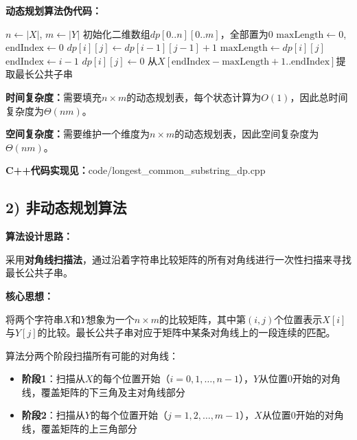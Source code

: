 \documentclass[UTF8,12pt,a4paper]{ctexart}
\begin{document}
\begin{enumerate}[1.]
	\textbf{动态规划算法伪代码：}
	\begin{algorithm}[H]%
		\caption{LCS-SUBSTRING-DP($X, Y$)}
		\begin{algorithmic}[1]
			\State $n \gets |X|$, $m \gets |Y|$
			\State 初始化二维数组$dp[0..n][0..m]$，全部置为0
			\State $\text{maxLength} \gets 0$, $\text{endIndex} \gets 0$
						\State $dp[i][j] \gets dp[i-1][j-1] + 1$
							\State $\text{maxLength} \gets dp[i][j]$
							\State $\text{endIndex} \gets i-1$ 
						\EndIf
					\Else
						\State $dp[i][j] \gets 0$
					\EndIf
				\EndFor
			\EndFor
			\State 从$X[\text{endIndex} - \text{maxLength} + 1..\text{endIndex}]$提取最长公共子串
			\State {}
		\end{algorithmic}
	\end{algorithm}

	\textbf{时间复杂度：}需要填充$n \times m$的动态规划表，每个状态计算为$O(1)$，因此总时间复杂度为$\Theta(nm)$。

	\textbf{空间复杂度：}需要维护一个维度为$n \times m$的动态规划表，因此空间复杂度为$\Theta(nm)$。

	\textbf{C++代码实现见：}code/longest\_common\_substring\_dp.cpp

	\subsection*{2) 非动态规划算法}

	\textbf{算法设计思路：}

	采用\textbf{对角线扫描法}，通过沿着字符串比较矩阵的所有对角线进行一次性扫描来寻找最长公共子串。

	\textbf{核心思想：}

	将两个字符串$X$和$Y$想象为一个$n \times m$的比较矩阵，其中第$(i,j)$个位置表示$X[i]$与$Y[j]$的比较。最长公共子串对应于矩阵中某条对角线上的一段连续的匹配。

	算法分两个阶段扫描所有可能的对角线：
	\begin{itemize}
		\item \textbf{阶段1}：扫描从$X$的每个位置开始（$i=0, 1, \ldots, n-1$），$Y$从位置0开始的对角线，覆盖矩阵的下三角及主对角线部分
		\item \textbf{阶段2}：扫描从$Y$的每个位置开始（$j=1, 2, \ldots, m-1$），$X$从位置0开始的对角线，覆盖矩阵的上三角部分
	\end{itemize}


\end{enumerate}
\end{document}
